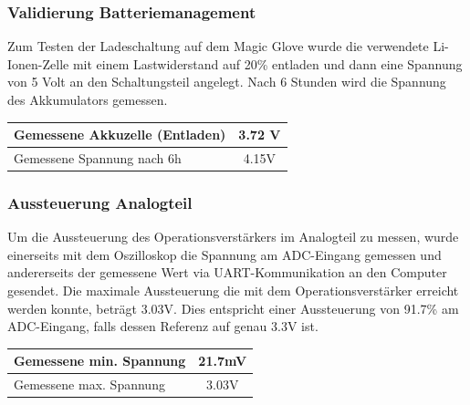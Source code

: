 \subsubsection*{Validierung Batteriemanagement}
Zum Testen der Ladeschaltung auf dem Magic Glove wurde die verwendete Li-Ionen-Zelle mit einem Lastwiderstand auf 20\% entladen und dann eine Spannung von 5 Volt an den Schaltungsteil angelegt. Nach 6 Stunden wird die Spannung des Akkumulators gemessen.
	\begin{center}
	\begin{tabular}{l|c}
		\hline 
		Gemessene Akkuzelle (Entladen) & 3.72 V \\ \hline
		Gemessene Spannung nach 6h & 4.15V \\ \hline
	\end{tabular} 
	\label{tab:MagicGlovevalid1}
\end{center}

\subsubsection*{Aussteuerung Analogteil}
Um die Aussteuerung des Operationsverstärkers im Analogteil zu messen, wurde einerseits mit dem Oszilloskop die Spannung am ADC-Eingang gemessen und andererseits der gemessene Wert via UART-Kommunikation an den Computer gesendet.
Die maximale Aussteuerung die mit dem Operationsverstärker erreicht werden konnte, beträgt 3.03V. Dies entspricht einer Aussteuerung von 91.7\% am ADC-Eingang, falls dessen Referenz auf genau 3.3V ist. 
\begin{center}
	\begin{tabular}{l|c}
		\hline 
		Gemessene min. Spannung & 21.7mV \\ \hline
		Gemessene max. Spannung & 3.03V \\ \hline
	\end{tabular} 
	\label{tab:MagicGlovevalid2}
\end{center}


